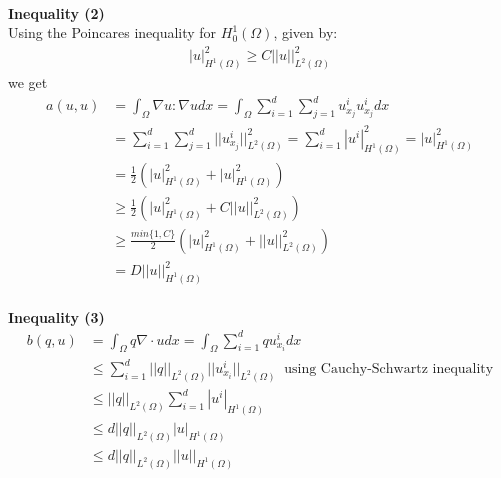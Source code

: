 \documentclass[11pt,a4paper]{report}
\begin{document}
\\
\textbf{Inequality (2)}
\\
Using the Poincares inequality for $H_0^1(\Omega)$, given by: 
\begin{align*}
|u|_{H^1(\Omega)}^2\geq C||u||_{L^2(\Omega)}^2
\end{align*} 
we get 
\begin{align*}
a(u,u)&= \int_{\Omega}\nabla u : \nabla u dx=\int_{\Omega}\sum_{i=1}^d\sum_{j=1}^d u_{x_j}^iu_{x_j}^idx \\
&=\sum_{i=1}^d\sum_{j=1}^d ||u_{x_j}^i||_{L^2(\Omega)}^2=\sum_{i=1}^d |u^i|_{H^1(\Omega)}^2 = |u|_{H^1(\Omega)}^2 \\
&= \frac{1}{2}(|u|_{H^1(\Omega)}^2+|u|_{H^1(\Omega)}^2) \\
&\geq \frac{1}{2}(|u|_{H^1(\Omega)}^2+C||u||_{L^2(\Omega)}^2) \\
&\geq \frac{min\{1,C\}}{2}(|u|_{H^1(\Omega)}^2+||u||_{L^2(\Omega)}^2) \\
&= D||u||_{H^1(\Omega)}^2
\end{align*}
\\
\textbf{Inequality (3)}
\\
\begin{align*}
b(q,u)&=\int_{\Omega} q\nabla \cdot u dx=\int_{\Omega}\sum_{i=1}^d qu_{x_i}^i dx \\
&\leq \sum_{i=1}^d ||q||_{L^2(\Omega)} ||u_{x_i}^i||_{L^2(\Omega)} \ \text{  using Cauchy-Schwartz inequality}  \\
&\leq ||q||_{L^2(\Omega)}\sum_{i=1}^d |u^i|_{H^1(\Omega)} \\
&\leq d||q||_{L^2(\Omega)}|u|_{H^1(\Omega)} \\
&\leq d||q||_{L^2(\Omega)}||u||_{H^1(\Omega)}
\end{align*}
\end{document}
